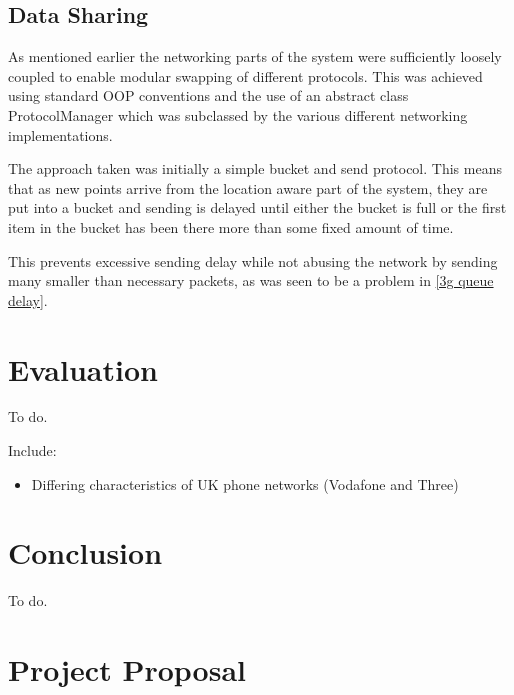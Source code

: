 \section{Data Sharing}

As mentioned earlier the networking parts of the system were sufficiently loosely coupled to enable modular swapping of different protocols. This was achieved using standard OOP conventions and the use of an abstract class ProtocolManager which was subclassed by the various different networking implementations.

The approach taken was initially a simple bucket and send protocol. This means that as new points arrive from the location aware part of the system, they are put into a bucket and sending is delayed until either the bucket is full or the first item in the bucket has been there more than some fixed amount of time.

This prevents excessive sending delay while not abusing the network by sending many smaller than necessary packets, as was seen to be a problem in \ref{3g queue delay}.





\cleardoublepage
\chapter{Evaluation}

To do.

Include:
\begin{itemize}
\item{Differing characteristics of UK phone networks (Vodafone and Three)}
\end{itemize}

\cleardoublepage
\chapter{Conclusion}

To do.

\cleardoublepage



\cleardoublepage

\appendix

\chapter{Project Proposal}

%


